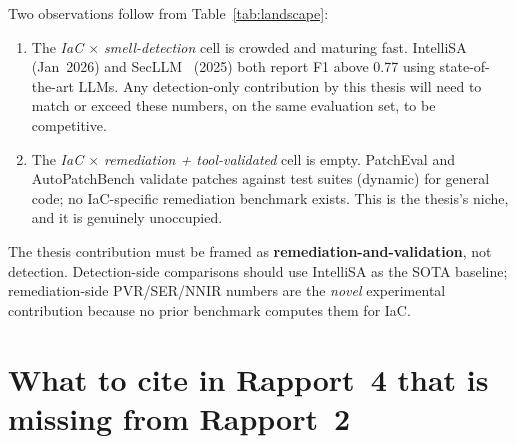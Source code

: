 \documentclass[11pt, a4paper]{report}
\begin{document}
Two observations follow from Table~\ref{tab:landscape}:

\begin{enumerate}
  \item The \emph{IaC $\times$ smell-detection} cell is crowded and
        maturing fast. IntelliSA~\citep{intellisa2026} (Jan~2026) and
        SecLLM~\citep{devito2025secllm} (2025) both report F1 above 0.77
        using state-of-the-art LLMs. Any detection-only contribution by
        this thesis will need to match or exceed these numbers, on the
        same evaluation set, to be competitive.
  \item The \emph{IaC $\times$ remediation + tool-validated} cell is
        empty. PatchEval and AutoPatchBench validate patches against
        test suites (dynamic) for general code; no IaC-specific
        remediation benchmark exists. This is the thesis's niche, and
        it is genuinely unoccupied.
\end{enumerate}

\begin{findingbox}
The thesis contribution must be framed as
\textbf{remediation-and-validation}, not detection. Detection-side
comparisons should use IntelliSA as the SOTA baseline; remediation-side
PVR/SER/NNIR numbers are the \emph{novel} experimental contribution
because no prior benchmark computes them for IaC.
\end{findingbox}

\section{What to cite in Rapport~4 that is missing from Rapport~2}
\end{document}
